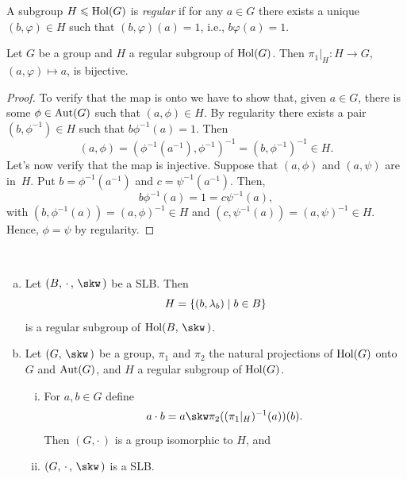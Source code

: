 \begin{defn}
    A subgroup $H\leqslant\operatorname{Hol}(G)$ is \textsl{regular} if for any $a\in G$ there exists a unique $(b,\varphi)\in H$ such that $(b,\varphi)(a)=1$, i.e., $b\varphi(a)=1$.
\end{defn}

\begin{lem}\label{lem:bijective-pi_1|_H}
    Let\/ $G$ be a group and\/ $H$ a regular subgroup of\/ $\operatorname{Hol}(G)$. Then\/ $\pi_1|_H : H \to G$, $(a,\varphi) \mapsto a$, is bijective.
\end{lem}

\begin{proof}
     To verify that the map is onto we have to show that, given $a\in G$, there is some $\phi\in{\rm Aut}(G)$ such that $(a,\phi)\in H$. By regularity there exists a pair $(b,\phi^{-1})\in H$ such that $b\phi^{-1}(a)=1$. Then
     $$
         (a,\phi)=(\phi^{-1}(a^{-1}),\phi^{-1})^{-1}
                =(b,\phi^{-1})^{-1}\in H.
     $$
    Let's now verify that the map is injective. Suppose that $(a,\phi)$ and $(a,\psi)$ are in~$H$. Put $b=\phi^{-1}(a^{-1})$ and $c=\psi^{-1}(a^{-1})$. Then,
    $$
        b\phi^{-1}(a) = 1 = c\psi^{-1}(a),
    $$
    with $(b,\phi^{-1}(a))=(a,\phi)^{-1}\in H$ and $(c,\psi^{-1}(a))=(a,\psi)^{-1}\in H$. Hence, $\phi=\psi$ by regularity.
\end{proof}

\begin{thm}\label{thm:SLB-regular-equivalence}${}$
    \begin{enumerate}[a),font=\upshape]
        \item Let\/ $(B,\,\cdot\,,\,\skw\,)$ be a SLB. Then
        $$
            H=\{(b,\lambda_b)\mid b\in B\}
        $$
        is a regular subgroup of\/ $\Hol(B,\,\skw\,)$.

        \item Let\/ $(G,\,\skw\,)$ be a group, $\pi_1$ and\/ $\pi_2$ the natural projections of\/ $\operatorname{Hol}(G)$\/ onto\/ $G$ and\/ ${\rm Aut}(G)$, and\/ $H$ a regular subgroup of\/ $\operatorname{Hol}(G)$. 
        \begin{enumerate}[i),font=\upshape]
            \item For\/ $a,b\in G$ define
             $$
             a\cdot b = a\skw\pi_2((\pi_1|_H)^{-1}(a))(b).
             $$
             Then\/ $(G,\cdot\,)$ is a group isomorphic to\/ $H$, and
             \item $(G,\,\cdot\,,\,\skw\,)$ is a SLB.
        \end{enumerate}
    \end{enumerate}
\end{thm}


